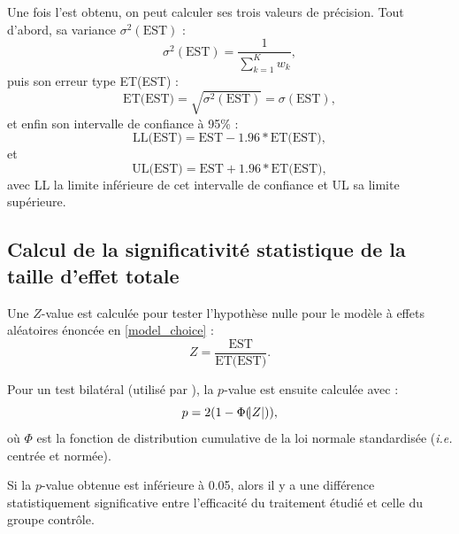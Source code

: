 Une fois l'\gls{est} obtenu, on peut calculer ses trois valeurs de précision. Tout d'abord, sa variance $\sigma^2(\text{EST})$ :  
\begin{equation}
\label{eq:metareview_variance_summary_effect}
\sigma^2(\text{EST}) = \frac{1} {\sum_{k=1}^{K} w_k},
\end{equation} 
puis son erreur type ET(EST) :
\begin{equation}
\label{eq:metareview_standard_error_effect}
\text{ET(EST)} = \sqrt{\sigma^2(\text{EST})} = \sigma(\text{EST}),
\end{equation} 
et enfin son intervalle de confiance à 95\% : 
\begin{equation}
\label{eq:metareview_confidence_interval_summary_effect_lower_bound}
\text{LL(EST)} = \text{EST} - 1.96 * \text{ET(EST)},
\end{equation}
et 
\begin{equation}
\label{eq:metareview_confidence_interval_summary_effect_upper_bound}
\text{UL(EST)} = \text{EST} + 1.96 * \text{ET(EST)},
\end{equation}
avec LL la limite inférieure de cet intervalle de confiance et UL sa limite supérieure.

\subsection{Calcul de la significativité statistique de la taille d'effet totale}

Une $Z$-value est calculée pour tester l'hypothèse nulle pour le modèle à effets aléatoires énoncée en \ref{model_choice} :
\begin{equation}
\label{eq:metareview_confidence_interval_summary_effect_z_value}
Z = \frac{\text{EST}} {\text{ET(EST)}}.
\end{equation}

Pour un test bilatéral (utilisé par \citet{Micoulaud2014, Cortese2016}), la $p$-value est ensuite calculée avec :
\begin{equation}
\label{eq:metareview_confidence_interval_summary_effect_p_value}
p = 2(1 - \Phi(\abs{Z})),
\end{equation} 
où $\Phi$ est la fonction de distribution cumulative de la loi normale standardisée (\textit{i.e.} centrée et normée).

Si la $p$-value obtenue est inférieure à 0.05, alors il y a une différence statistiquement significative entre l'efficacité du traitement étudié 
et celle du groupe contrôle.

